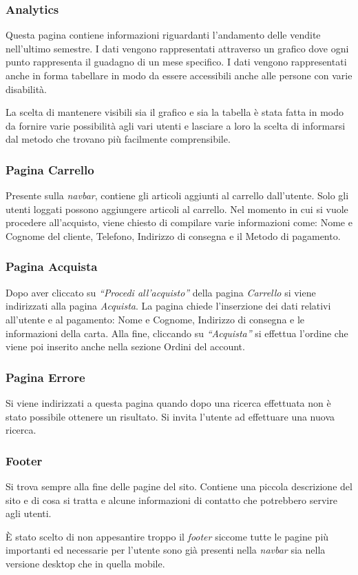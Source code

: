 \subsubsection{Analytics}
Questa pagina contiene informazioni riguardanti l’andamento delle vendite nell'ultimo semestre. I dati vengono rappresentati attraverso un grafico dove ogni punto rappresenta il guadagno di un mese specifico. I dati vengono rappresentati anche in forma tabellare in modo da essere accessibili anche alle persone con varie disabilità.

La scelta di mantenere visibili sia il grafico e sia la tabella è stata fatta in modo da fornire varie possibilità agli vari utenti e lasciare a loro la scelta di informarsi dal metodo che trovano più facilmente comprensibile.

\subsubsection{Pagina Carrello}
Presente sulla \textit{navbar}, contiene gli articoli aggiunti al carrello dall’utente. Solo gli utenti loggati possono aggiungere articoli al carrello. Nel momento in cui si vuole procedere all'acquisto, viene chiesto di compilare varie informazioni come: Nome e Cognome del cliente, Telefono, Indirizzo di consegna e il Metodo di pagamento.

\subsubsection{Pagina Acquista}
Dopo aver cliccato su \textit{“Procedi all’acquisto”} della pagina \textit{Carrello} si viene indirizzati alla pagina \textit{Acquista}. La pagina chiede l’inserzione dei dati relativi all'utente e al pagamento: Nome e Cognome, Indirizzo di consegna e le informazioni della carta. Alla fine, cliccando su \textit{“Acquista”} si effettua l’ordine che viene poi inserito anche nella sezione Ordini del account.

\subsubsection{Pagina Errore}
Si viene indirizzati a questa pagina quando dopo una ricerca effettuata non è stato possibile ottenere un risultato. Si invita l’utente ad effettuare una nuova ricerca.

\subsubsection{Footer}
Si trova sempre alla fine delle pagine del sito. Contiene una piccola descrizione del sito e di cosa si tratta e alcune informazioni di contatto che potrebbero servire agli utenti.

È stato scelto di non appesantire troppo il \textit{footer} siccome tutte le pagine più importanti ed necessarie per l’utente sono già presenti nella \textit{navbar} sia nella versione desktop che in quella mobile.

	
	
	
	